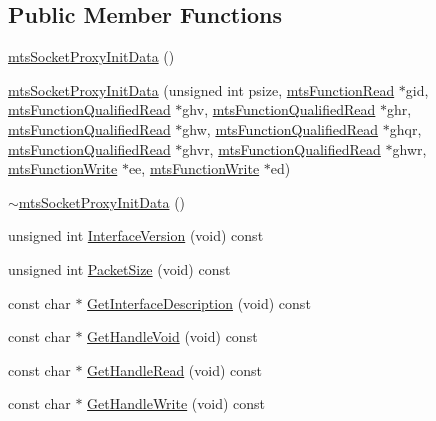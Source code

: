 \subsection*{Public Member Functions}
\begin{DoxyCompactItemize}
\item 
\hyperlink{classmts_socket_proxy_init_data_a0fa824a91dbd7cdf2aad73ef02278b48}{mts\-Socket\-Proxy\-Init\-Data} ()
\item 
\hyperlink{classmts_socket_proxy_init_data_ab4f9383394c2cf8bdf6044dda0af7242}{mts\-Socket\-Proxy\-Init\-Data} (unsigned int psize, \hyperlink{classmts_function_read}{mts\-Function\-Read} $\ast$gid, \hyperlink{classmts_function_qualified_read}{mts\-Function\-Qualified\-Read} $\ast$ghv, \hyperlink{classmts_function_qualified_read}{mts\-Function\-Qualified\-Read} $\ast$ghr, \hyperlink{classmts_function_qualified_read}{mts\-Function\-Qualified\-Read} $\ast$ghw, \hyperlink{classmts_function_qualified_read}{mts\-Function\-Qualified\-Read} $\ast$ghqr, \hyperlink{classmts_function_qualified_read}{mts\-Function\-Qualified\-Read} $\ast$ghvr, \hyperlink{classmts_function_qualified_read}{mts\-Function\-Qualified\-Read} $\ast$ghwr, \hyperlink{classmts_function_write}{mts\-Function\-Write} $\ast$ee, \hyperlink{classmts_function_write}{mts\-Function\-Write} $\ast$ed)
\item 
\hyperlink{classmts_socket_proxy_init_data_af07b95ffdb2c1dfc3abb1774d77e4fab}{$\sim$mts\-Socket\-Proxy\-Init\-Data} ()
\item 
unsigned int \hyperlink{classmts_socket_proxy_init_data_a4fbb4b7db870b1bdb4cb5c2494445398}{Interface\-Version} (void) const 
\item 
unsigned int \hyperlink{classmts_socket_proxy_init_data_ae338904222707e27cbf7fa2e71aa3896}{Packet\-Size} (void) const 
\item 
const char $\ast$ \hyperlink{classmts_socket_proxy_init_data_a5e51fb73ef660bebc91e97408038e469}{Get\-Interface\-Description} (void) const 
\item 
const char $\ast$ \hyperlink{classmts_socket_proxy_init_data_ac7b786d0024c84c4138e4ef7bb3e04f8}{Get\-Handle\-Void} (void) const 
\item 
const char $\ast$ \hyperlink{classmts_socket_proxy_init_data_a85e5ab435f2560d0537f43c68a372a9b}{Get\-Handle\-Read} (void) const 
\item 
const char $\ast$ \hyperlink{classmts_socket_proxy_init_data_ad82180bfeb45f5922885a902929122d7}{Get\-Handle\-Write} (void) const 
\item 

\end{DoxyCompactItemize}
